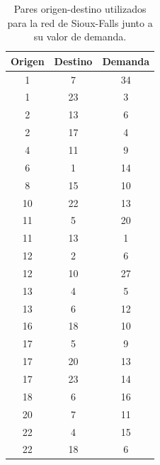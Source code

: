 \begin{table}[h!]
\centering
\begin{tabular}{ccc}
  \toprule
    Origen & Destino & Demanda \\
  \midrule
    1 & 7 & 34 \\
    1 & 23 & 3 \\
    2 & 13 & 6 \\
    2 & 17 & 4 \\
    4 & 11 & 9 \\
    6 & 1 & 14 \\
    8 & 15 & 10 \\
    10 & 22 & 13 \\
    11 & 5 & 20 \\
    11 & 13 & 1 \\
    12 & 2 & 6 \\
    12 & 10 & 27 \\
    13 & 4 & 5 \\
    13 & 6 & 12 \\
    16 & 18 & 10 \\
    17 & 5 & 9 \\
    17 & 20 & 13 \\
    17 & 23 & 14 \\
    18 & 6 & 16 \\
    20 & 7 & 11 \\
    22 & 4 & 15 \\
    22 & 18 & 6 \\
  \bottomrule
\end{tabular}
\caption{Pares origen-destino utilizados para la red de Sioux-Falls junto a su valor de demanda.}\label{table:siouxfallsdemanddata}
\end{table}

